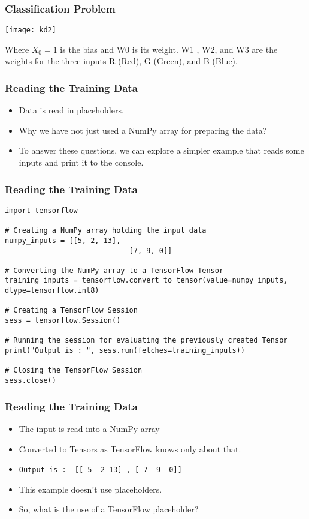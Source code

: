 \begin{frame}[fragile] \frametitle{Classification Problem}

\begin{center}
\texttt{[image: kd2]}
\end{center}
Where $X_0=1$ is the bias and W0 is its weight. W1 , W2, and W3 are the weights for the three inputs R (Red), G (Green), and B (Blue).
\end{frame}


\begin{frame}[fragile] \frametitle{Reading the Training Data}

\begin{itemize}
\item Data is read in placeholders.
\item Why we have not just used a NumPy array for preparing the data? 
\item To answer these questions, we can explore a simpler example that reads some inputs and print it to the console.
\end{itemize}
\end{frame}

\begin{frame}[fragile] \frametitle{Reading the Training Data}
\begin{lstlisting}
import tensorflow  
  
# Creating a NumPy array holding the input data  
numpy_inputs = [[5, 2, 13],  
    			             [7, 9, 0]]  
    			             
# Converting the NumPy array to a TensorFlow Tensor  
training_inputs = tensorflow.convert_to_tensor(value=numpy_inputs, dtype=tensorflow.int8)  

# Creating a TensorFlow Session  
sess = tensorflow.Session()  
  
# Running the session for evaluating the previously created Tensor  
print("Output is : ", sess.run(fetches=training_inputs))  
  
# Closing the TensorFlow Session  
sess.close()
\end{lstlisting}
\end{frame}


\begin{frame}[fragile] \frametitle{Reading the Training Data}

\begin{itemize}
\item The input is read into a NumPy array
\item Converted to Tensors as TensorFlow knows only about that.
\item \lstinline|Output is :  [[ 5  2 13] , [ 7  9  0]]|
\item This example doesn't use placeholders. 
\item So, what is the use of a TensorFlow placeholder? 
\end{itemize}
\end{frame}


